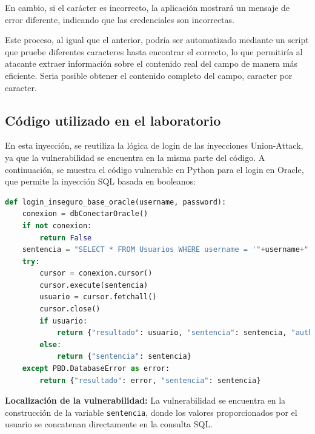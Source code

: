 \documentclass[a4paper,12pt]{article}
\begin{document}
En cambio, si el carácter es incorrecto, la aplicación mostrará un mensaje de error diferente, indicando que las credenciales son incorrectas.

\vspace{0,5cm}

Este proceso, al igual que el anterior, podría ser automatizado mediante un script que pruebe diferentes caracteres hasta encontrar el correcto, lo que permitiría al atacante extraer información sobre el contenido real del campo de manera más eficiente. Seria posible obtener el contenido completo del campo, caracter por caracter.

\vspace{0,5cm}

\subsection{Código utilizado en el laboratorio}

En esta inyección, se reutiliza la lógica de login de las inyecciones Union-Attack, ya que la vulnerabilidad se encuentra en la misma parte del código. A continuación, se muestra el código vulnerable en Python para el login en Oracle, que permite la inyección SQL basada en booleanos:
\vspace{0,5cm}


\begin{lstlisting}[language=Python]
def login_inseguro_base_oracle(username, password):
    conexion = dbConectarOracle()
    if not conexion:
        return False
    sentencia = "SELECT * FROM Usuarios WHERE username = '"+username+"' AND password = '"+password+"'"
    try:
        cursor = conexion.cursor()
        cursor.execute(sentencia)
        usuario = cursor.fetchall()
        cursor.close()
        if usuario:
            return {"resultado": usuario, "sentencia": sentencia, "auth": "true"}
        else:
            return {"sentencia": sentencia}
    except PBD.DatabaseError as error:
        return {"resultado": error, "sentencia": sentencia}
\end{lstlisting}

\vspace{0,5cm}

\textbf{Localización de la vulnerabilidad:} La vulnerabilidad se encuentra en la construcción de la variable \texttt{sentencia}, donde los valores proporcionados por el usuario se concatenan directamente en la consulta SQL.

\vspace{0,5cm}
\end{document}
